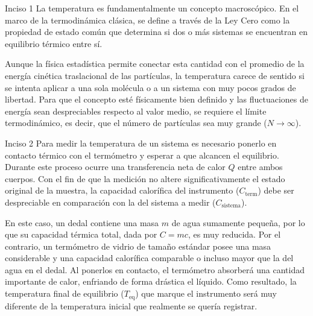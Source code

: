 \documentclass[11pt,letterpaper]{article}
\begin{document}
\begin{inciso}{Inciso 1}
La temperatura es fundamentalmente un concepto macroscópico. En el marco de la termodinámica clásica, se define a través de la Ley Cero como la propiedad de estado común que determina si dos o más sistemas se encuentran en equilibrio térmico entre sí.

Aunque la física estadística permite conectar esta cantidad con el promedio de la energía cinética traslacional de las partículas, la temperatura carece de sentido si se intenta aplicar a una sola molécula o a un sistema con muy pocos grados de libertad. Para que el concepto esté físicamente bien definido y las fluctuaciones de energía sean despreciables respecto al valor medio, se requiere el límite termodinámico, es decir, que el número de partículas sea muy grande ($N \to \infty$).
\end{inciso}
\begin{inciso}{Inciso 2}
Para medir la temperatura de un sistema es necesario ponerlo en contacto térmico con el termómetro y esperar a que alcancen el equilibrio. Durante este proceso ocurre una transferencia neta de calor $Q$ entre ambos cuerpos. Con el fin de que la medición no altere significativamente el estado original de la muestra, la capacidad calorífica del instrumento ($C_{\text{term}}$) debe ser despreciable en comparación con la del sistema a medir ($C_{\text{sistema}}$).

En este caso, un dedal contiene una masa $m$ de agua sumamente pequeña, por lo que su capacidad térmica total, dada por $C = mc$, es muy reducida. Por el contrario, un termómetro de vidrio de tamaño estándar posee una masa considerable y una capacidad calorífica comparable o incluso mayor que la del agua en el dedal. Al ponerlos en contacto, el termómetro absorberá una cantidad importante de calor, enfriando de forma drástica el líquido. Como resultado, la temperatura final de equilibrio ($T_{\text{eq}}$) que marque el instrumento será muy diferente de la temperatura inicial que realmente se quería registrar.
\end{inciso}
\end{document}

